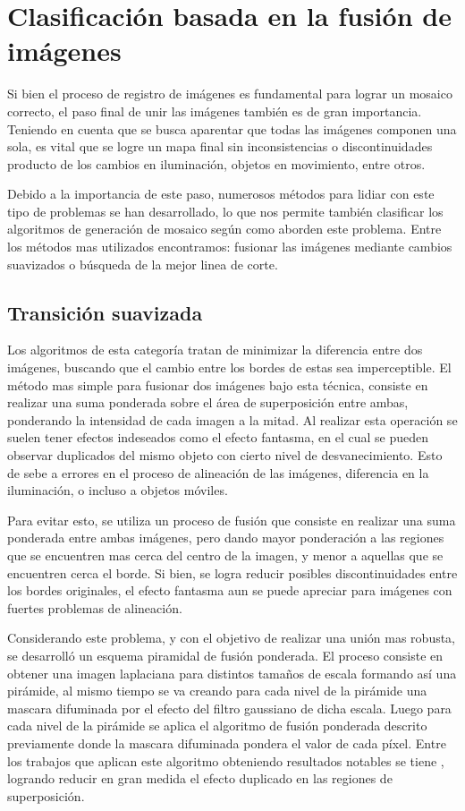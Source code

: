 \section*{Clasificación basada en la fusión de imágenes}

Si bien el proceso de registro de imágenes es fundamental para lograr un mosaico correcto, el paso final de unir las imágenes también es de gran importancia. Teniendo en cuenta que se busca aparentar que todas las imágenes componen una sola, es vital que se logre un mapa final sin inconsistencias o discontinuidades producto de los cambios en iluminación, objetos en movimiento, entre otros.

Debido a la importancia de este paso, numerosos métodos para lidiar con este tipo de problemas se han desarrollado, lo que nos permite también clasificar los algoritmos de generación de mosaico según como aborden este problema. Entre los métodos mas utilizados encontramos: fusionar las imágenes mediante cambios suavizados o búsqueda de la mejor linea de corte.

\subsection*{Transición suavizada}

Los algoritmos de esta categoría tratan de minimizar la diferencia entre dos imágenes, buscando que el cambio entre los bordes de estas sea imperceptible. El método mas simple para fusionar dos imágenes bajo esta técnica, consiste en realizar una suma ponderada sobre el área de superposición entre ambas, ponderando la intensidad de cada imagen a la mitad. Al realizar esta operación se suelen tener efectos indeseados como el efecto fantasma, en el cual se pueden observar duplicados del mismo objeto con cierto nivel de desvanecimiento. Esto de sebe a errores en el proceso de alineación de las imágenes, diferencia en la iluminación, o incluso a objetos móviles. 

Para evitar esto, se utiliza un proceso de fusión que consiste en realizar una suma ponderada entre ambas imágenes, pero dando mayor ponderación a las regiones que se encuentren mas cerca del centro de la imagen, y menor a aquellas que se encuentren cerca el borde. Si bien, se logra reducir posibles discontinuidades entre los bordes originales, el efecto fantasma aun se puede apreciar para imágenes con fuertes problemas de alineación.

Considerando este problema, y con el objetivo de realizar una unión mas robusta, se desarrolló un esquema piramidal de fusión ponderada. El proceso consiste en obtener una imagen laplaciana para distintos tamaños de escala formando así una pirámide, al mismo tiempo se va creando para cada nivel de la pirámide una mascara difuminada por el efecto del filtro gaussiano de dicha escala. Luego para cada nivel de la pirámide se aplica el algoritmo de fusión ponderada descrito previamente donde la mascara  difuminada pondera el valor de cada píxel. Entre los trabajos que aplican este algoritmo obteniendo resultados notables se tiene \cite{multiband}, logrando reducir en gran medida el efecto duplicado en las regiones de superposición.

